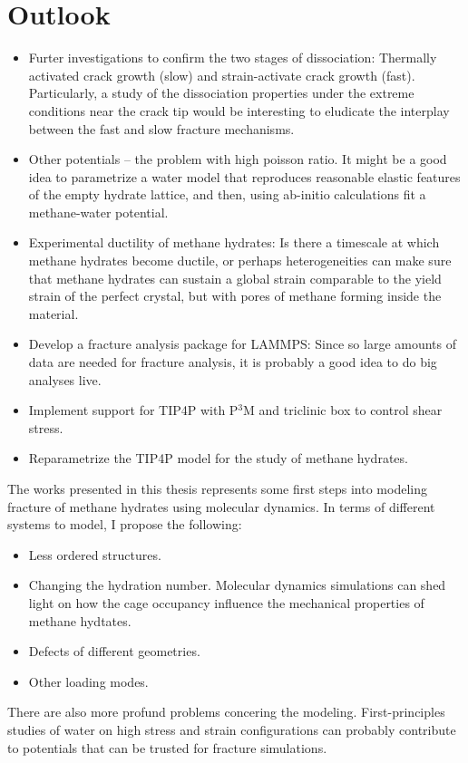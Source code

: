 \section{Outlook}
\begin{itemize}
\item Furter investigations to confirm the two stages of dissociation: Thermally activated crack growth (slow) and strain-activate crack growth (fast). Particularly, a study of the dissociation properties under the extreme conditions near the crack tip would be interesting to eludicate the interplay between the fast and slow fracture mechanisms.
\item Other potentials -- the problem with high poisson ratio. It might be a good idea to parametrize a water model that reproduces reasonable elastic features of the empty hydrate lattice, and then, using ab-initio calculations fit a methane-water potential.
\item Experimental ductility of methane hydrates: Is there a timescale at which methane hydrates become ductile, or perhaps heterogeneities can make sure that methane hydrates can sustain a global strain comparable to the yield strain of the perfect crystal, but with pores of methane forming inside the material. 
\item Develop a fracture analysis package for LAMMPS: Since so large amounts of data are needed for fracture analysis, it is probably a good idea to do big analyses live.
\item Implement support for TIP4P with P$^3$M and triclinic box to control shear stress.
\item Reparametrize the TIP4P model for the study of methane hydrates.
\end{itemize}

The works presented in this thesis represents some first steps into modeling fracture of methane hydrates using molecular dynamics. In terms of different systems to model, I propose the following:
%
\begin{itemize}
\item Less ordered structures.
\item Changing the hydration number. Molecular dynamics simulations can shed light on how the cage occupancy influence the mechanical properties of methane hydtates.
\item Defects of different geometries.
\item Other loading modes.
\end{itemize}
%
There are also more profund problems concering the modeling. First-principles studies of water on high stress and strain configurations can probably contribute to potentials that can be trusted for fracture simulations. 

